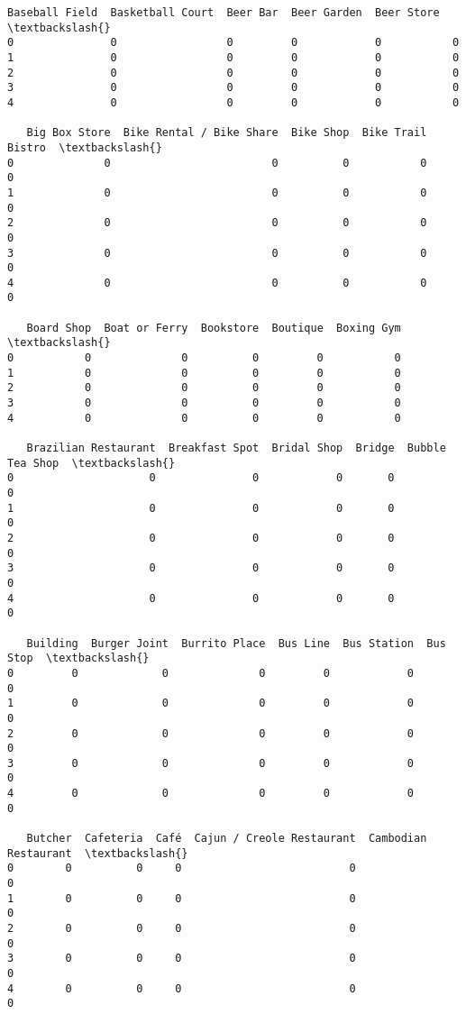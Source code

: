 \documentclass[11pt]{article}
\begin{document}
\begin{tcolorbox}[breakable, size=fbox, boxrule=.5pt, pad at break*=1mm, opacityfill=0]
\begin{Verbatim}[commandchars=\\\{\}]
   Baseball Field  Basketball Court  Beer Bar  Beer Garden  Beer Store  \textbackslash{}
0               0                 0         0            0           0
1               0                 0         0            0           0
2               0                 0         0            0           0
3               0                 0         0            0           0
4               0                 0         0            0           0

   Big Box Store  Bike Rental / Bike Share  Bike Shop  Bike Trail  Bistro  \textbackslash{}
0              0                         0          0           0       0
1              0                         0          0           0       0
2              0                         0          0           0       0
3              0                         0          0           0       0
4              0                         0          0           0       0

   Board Shop  Boat or Ferry  Bookstore  Boutique  Boxing Gym  \textbackslash{}
0           0              0          0         0           0
1           0              0          0         0           0
2           0              0          0         0           0
3           0              0          0         0           0
4           0              0          0         0           0

   Brazilian Restaurant  Breakfast Spot  Bridal Shop  Bridge  Bubble Tea Shop  \textbackslash{}
0                     0               0            0       0                0
1                     0               0            0       0                0
2                     0               0            0       0                0
3                     0               0            0       0                0
4                     0               0            0       0                0

   Building  Burger Joint  Burrito Place  Bus Line  Bus Station  Bus Stop  \textbackslash{}
0         0             0              0         0            0         0
1         0             0              0         0            0         0
2         0             0              0         0            0         0
3         0             0              0         0            0         0
4         0             0              0         0            0         0

   Butcher  Cafeteria  Café  Cajun / Creole Restaurant  Cambodian Restaurant  \textbackslash{}
0        0          0     0                          0                     0
1        0          0     0                          0                     0
2        0          0     0                          0                     0
3        0          0     0                          0                     0
4        0          0     0                          0                     0


\end{Verbatim}
\end{tcolorbox}
\end{document}

